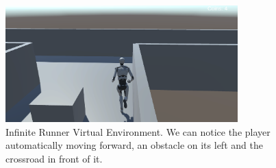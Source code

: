 \begin{figure}[!htbp]
    \centering
    \includegraphics[width=0.8\textwidth]{Figures/Methodology/infinite_runner}
    \caption{Infinite Runner Virtual Environment. We can notice the player automatically moving forward, an obstacle on its left and the crossroad in front of it.}\label{fig:infinite_runner}
\end{figure}

